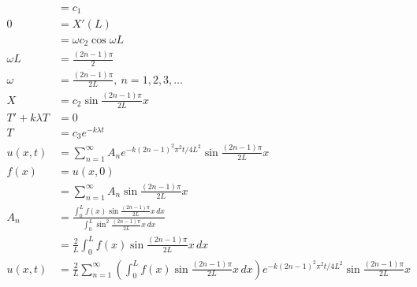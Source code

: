 \documentclass{article}
\begin{document}
\begin{align*}
                   & = c_1                                                                                                                                                                     \\
  0                & = X'(L)                                                                                                                                                                   \\
                   & = \omega c_2 \cos \omega L                                                                                                                                                \\
  \omega L         & = \frac{(2 n - 1) \pi}{2}                                                                                                                                                 \\
  \omega           & = \frac{(2 n - 1) \pi}{2 L},\ n = 1, 2, 3, \ldots                                                                                                                         \\
  X                & = c_2 \sin \frac{(2 n - 1) \pi}{2 L} x                                                                                                                                    \\
  T' + k \lambda T & = 0                                                                                                                                                                       \\
  T                & = c_3 e^{-k \lambda t}                                                                                                                                                    \\
  u(x, t)          & = \sum_{n = 1}^\infty A_n e^{-k (2 n - 1)^2 \pi^2 t / 4 L^2} \sin \frac{(2 n - 1) \pi}{2 L} x                                                                             \\
  f(x)             & = u(x, 0)                                                                                                                                                                 \\
                   & = \sum_{n = 1}^\infty A_n \sin \frac{(2 n - 1) \pi}{2 L} x                                                                                                                \\
  A_n              & = \frac{\int_0^L f(x) \sin \frac{(2 n - 1) \pi}{2 L} x \,d x}{\int_0^L \sin^2 \frac{(2 n - 1) \pi}{2 L} x \,d x}                                                          \\
                   & = \frac{2}{L} \int_0^L f(x) \sin \frac{(2 n - 1) \pi}{2 L} x \,d x                                                                                                        \\
  u(x, t)          & = \frac{2}{L} \sum_{n = 1}^\infty \left( \int_0^L f(x) \sin \frac{(2 n - 1) \pi}{2 L} x \,d x \right) e^{-k (2 n - 1)^2 \pi^2 t / 4 L^2} \sin \frac{(2 n - 1) \pi}{2 L} x
\end{align*}
\end{document}
